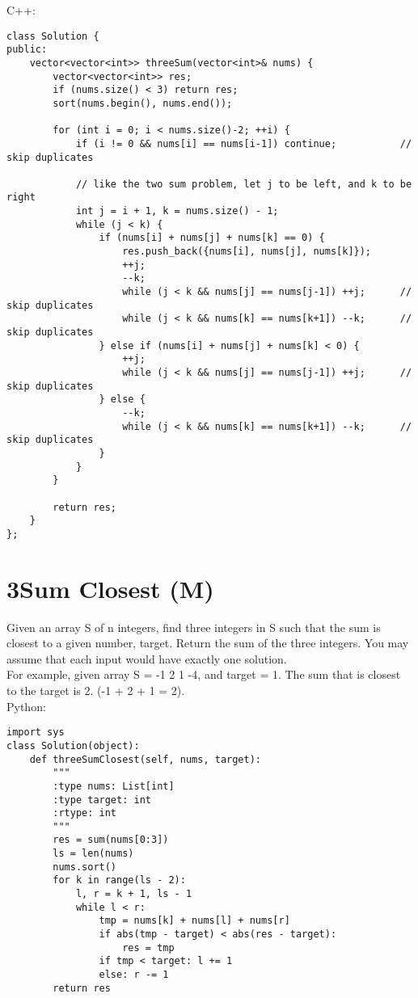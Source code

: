 C++:
\lstset{language=C++}
\begin{lstlisting}
class Solution {
public:
    vector<vector<int>> threeSum(vector<int>& nums) {
        vector<vector<int>> res;
        if (nums.size() < 3) return res;
        sort(nums.begin(), nums.end());

        for (int i = 0; i < nums.size()-2; ++i) {
            if (i != 0 && nums[i] == nums[i-1]) continue;           // skip duplicates
            
            // like the two sum problem, let j to be left, and k to be right
            int j = i + 1, k = nums.size() - 1;                     
            while (j < k) {
                if (nums[i] + nums[j] + nums[k] == 0) {
                    res.push_back({nums[i], nums[j], nums[k]});
                    ++j;
                    --k;
                    while (j < k && nums[j] == nums[j-1]) ++j;      // skip duplicates
                    while (j < k && nums[k] == nums[k+1]) --k;      // skip duplicates
                } else if (nums[i] + nums[j] + nums[k] < 0) {
                    ++j;
                    while (j < k && nums[j] == nums[j-1]) ++j;      // skip duplicates
                } else {
                    --k;
                    while (j < k && nums[k] == nums[k+1]) --k;      // skip duplicates
                }
            }
        }
        
        return res;
    }
};
\end{lstlisting}


\section{3Sum Closest (M)}
Given an array S of n integers, find three integers in S such that the sum is closest to a given number, target. Return the sum of the three integers. You may assume that each input would have exactly one solution. \\

For example, given array S = {-1 2 1 -4}, and target = 1. The sum that is closest to the target is 2. (-1 + 2 + 1 = 2).\\

Python:
\lstset{language=python}
\begin{lstlisting}
import sys
class Solution(object):
    def threeSumClosest(self, nums, target):
        """
        :type nums: List[int]
        :type target: int
        :rtype: int
        """
        res = sum(nums[0:3])
        ls = len(nums)
        nums.sort()
        for k in range(ls - 2):
            l, r = k + 1, ls - 1
            while l < r:
                tmp = nums[k] + nums[l] + nums[r]
                if abs(tmp - target) < abs(res - target):
                    res = tmp
                if tmp < target: l += 1
                else: r -= 1
        return res
\end{lstlisting}

